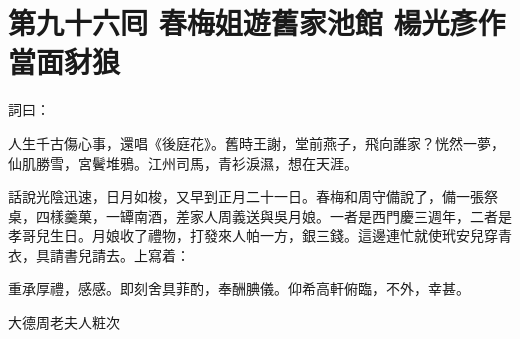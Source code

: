 
\chapter*{第九十六囘 春梅姐遊舊家池館 楊光彥作當面豺狼}


詞曰：

\begin{myquote}
人生千古傷心事，還唱《後庭花》。舊時王謝，堂前燕子，飛向誰家？恍然一夢，仙肌勝雪，宮鬢堆鴉。江州司馬，青衫淚濕，想在天涯。

\end{myquote}

話說光陰迅速，日月如梭，又早到正月二十一日。春梅和周守備說了，備一張祭桌，四樣羹菓，一罈南酒，差家人周義送與吳月娘。一者是西門慶三週年，二者是孝哥兒生日。月娘收了禮物，打發來人帕一方，銀三錢。這邊連忙就使玳安兒穿青衣，具請書兒請去。上寫着：

\begin{myquote}[\markfont]
重承厚禮，感感。即刻舍具菲酌，奉酬腆儀。仰希高軒俯臨，不外，幸甚。


大德周老夫人粧次
\end{myquote}


